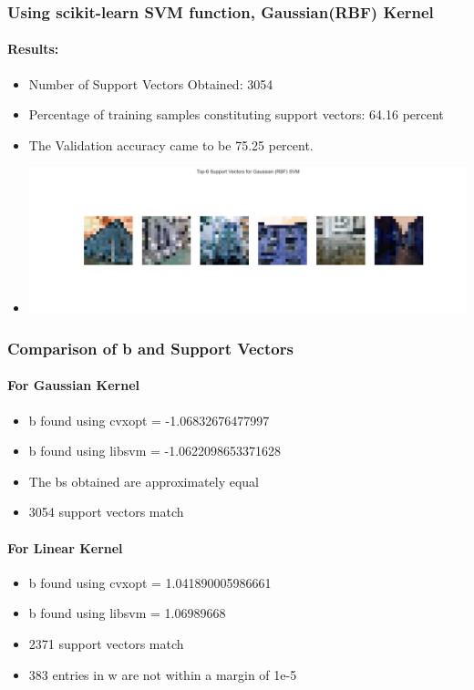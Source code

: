 \documentclass[12pt,a4paper]{article}
\begin{document}
\subsubsection{Using scikit-learn SVM function, Gaussian(RBF) Kernel}
\paragraph{Results:}
\begin{itemize}
    \item Number of Support Vectors Obtained: 3054
    \item Percentage of training samples constituting support vectors: 64.16 percent
    \item The Validation accuracy came to be 75.25 percent.
    \item \includegraphics[width=\textwidth]{Assignment 2/q2/top_6_support_vectors_rbf libsvm rbf.png}
\end{itemize}

\subsubsection{Comparison of b and Support Vectors}
\paragraph{For Gaussian Kernel}
\begin{itemize}
    \item b found using cvxopt = -1.06832676477997
    \item b found using libsvm = -1.0622098653371628
    \item The bs obtained are approximately equal
    \item 3054 support vectors match
\end{itemize}

\paragraph{For Linear Kernel}
\begin{itemize}
    \item b found using cvxopt = 1.041890005986661
    \item b found using libsvm = 1.06989668
    \item 2371 support vectors match
    \item 383 entries in w are not within a margin of 1e-5 
\end{itemize}
\end{document}
